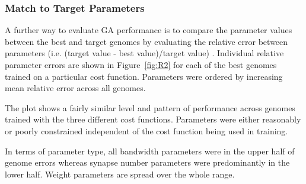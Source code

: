 \subsubsection{Match to Target Parameters}

A further way to evaluate GA performance is to compare the parameter values
between the best and target genomes by evaluating the relative error between
parameters (i.e. (target value - best value)/target value) . Individual relative
parameter errors are shown in Figure~\ref{fig:R2} for each of the best genomes
trained on a particular cost function. Parameters were ordered by increasing
mean relative error across all genomes.

\medskip{}

The plot shows a fairly similar level and pattern of performance across genomes
trained with the three different cost functions. Parameters were either
reasonably or poorly constrained independent of the cost function being used in
training. 

\medskip{}

In terms of parameter type, all bandwidth parameters were in the upper half of
genome errors whereas synapse number parameters were predominantly in the lower
half.  Weight parameters are spread over the whole range.


% 



% 

